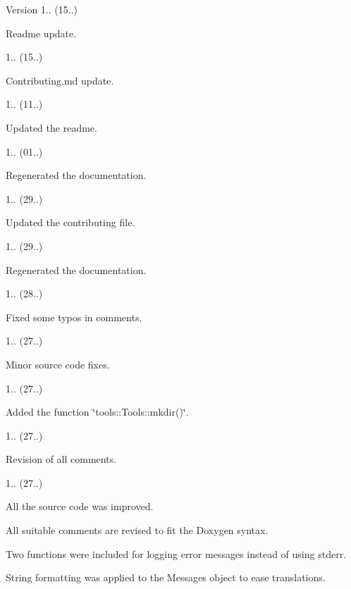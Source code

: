 \begin{DoxyVersion}{Version}
1.. (15..)
\begin{DoxyItemize}
\item Readme update. 
\end{DoxyItemize}

1.. (15..)
\begin{DoxyItemize}
\item Contributing.\+md update. 
\end{DoxyItemize}

1.. (11..)
\begin{DoxyItemize}
\item Updated the readme. 
\end{DoxyItemize}

1.. (01..)
\begin{DoxyItemize}
\item Regenerated the documentation. 
\end{DoxyItemize}

1.. (29..)
\begin{DoxyItemize}
\item Updated the contributing file. 
\end{DoxyItemize}

1.. (29..)
\begin{DoxyItemize}
\item Regenerated the documentation. 
\end{DoxyItemize}

1.. (28..)
\begin{DoxyItemize}
\item Fixed some typos in comments. 
\end{DoxyItemize}

1.. (27..)
\begin{DoxyItemize}
\item Minor source code fixes. 
\end{DoxyItemize}

1.. (27..)
\begin{DoxyItemize}
\item Added the function \char`\"{}tools\+::\+Tools\+::mkdir()\char`\"{}. 
\end{DoxyItemize}

1.. (27..)
\begin{DoxyItemize}
\item Revision of all comments. 
\end{DoxyItemize}

1.. (27..)
\begin{DoxyItemize}
\item All the source code was improved.
\item All suitable comments are revised to fit the Doxygen syntax.
\item Two functions were included for logging error messages instead of using stderr.
\item String formatting was applied to the Messages object to ease translations. 
\end{DoxyItemize}
\end{DoxyVersion}
